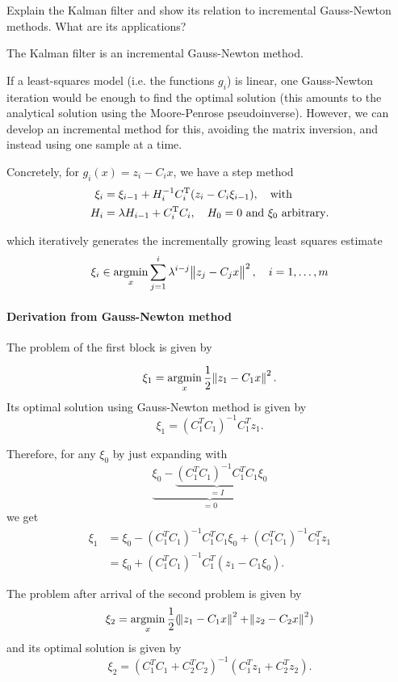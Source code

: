 \documentclass[12pt,a4paper]{article}
\begin{document}
\begin{question}
Explain the Kalman filter and show its relation to incremental Gauss-Newton methods. What are its applications?
\end{question}

The Kalman filter is an incremental Gauss-Newton method.

If a least-squares model (i.e. the functions \(g_i\)) is linear, one Gauss-Newton iteration would be
enough to find the optimal solution (this amounts to the analytical solution using the Moore-Penrose
pseudoinverse).  However, we can develop an incremental method for this, avoiding the matrix
inversion, and instead using one sample at a time.

Concretely, for \(g_i(x) = z_i - C_i x\), we have a step method
\begin{align*}
  \xi_i &= \xi_{i-1} + H_i^{-1}C_i^{\mathrm{T}}(z_i - C_i \xi_{i-1}), \quad\text{with} \\
  H_i &= \lambda H_{i-1} + C_i^{\mathrm{T}}C_i, \quad H_0 = 0 \text{ and } \xi_0 \text{ arbitrary}.
\end{align*}

which iteratively generates the incrementally growing least squares estimate
$$ \xi_i \in \operatorname*{arg min}_x \sum_{j=1} ^{i}\lambda^{i-j}\norm{z_j-C_jx}^2, \quad i=1,\dots,m$$

\paragraph{Derivation from Gauss-Newton method}
The problem of the first block is given by 

$$ \xi_1 = \operatorname*{arg min}_x \frac{1}{2}\norm{z_1-C_1x}^2.$$
Its optimal solution using Gauss-Newton method is given by
$$\xi_1 = (C_1^TC_1)^{-1}C_1^Tz_1.$$

Therefore, for any $\xi_0$ by just expanding with
\begin{equation*}
    \underbrace{\xi_0 - \underbrace{(C_1^TC_1)^{-1}C_1^TC_1}_{= I}\xi_0}_{= 0}
\end{equation*}
we get
\begin{align*}
  \xi_1 &= \xi_0 - (C_1^TC_1)^{-1}C_1^TC_1\xi_0+(C_1^TC_1)^{-1}C_1^Tz_1 \\
        &= \xi_0 + (C_1^TC_1)^{-1}C_1^T (z_1-C_1\xi_0).
\end{align*}

The problem after arrival of the second problem is given by
$$ \xi_2 = \operatorname*{arg min}_x \frac{1}{2}(\norm{z_1-C_1x}^2+\norm{z_2-C_2x}^2)$$
and its optimal solution is given by
$$\xi_2 = (C_1^TC_1+C_2^TC_2)^{-1}(C_1^Tz_1+C_2^Tz_2).$$
\end{document}
